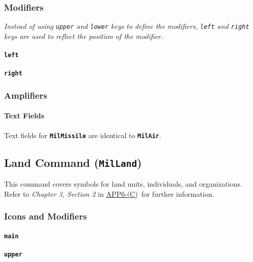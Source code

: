 \documentclass[a4paper, titlepage]{article}
\newcommand\DocLink{\href{https://www.awl.edu.pl/images/en/APP_6_C.pdf}{APP6-(C)}}
\begin{document}
\subsubsection{Modifiers}

\textit{Instead of using \texttt{upper} and \texttt{lower} keys to define the modifiers, \texttt{left} and \texttt{right} keys are used to reflect the position of the modifier.}

\paragraph{\texttt{left}}\quad


\paragraph{\texttt{right}}\quad


\subsubsection{Amplifiers}

\paragraph{Text Fields}

Text fields for \textbf{\texttt{MilMissile}} are identical to \textbf{\texttt{MilAir}}.

\subsection{Land Command (\textbf{\texttt{MilLand}})}

This command covers symbols for land units, individuals, and organizations. Refer to \textit{Chapter 3, Section 2} in \DocLink\ for further information.

\subsubsection{Icons and Modifiers}

\paragraph{\texttt{main}}\quad


\paragraph{\texttt{upper}}\quad

\end{document}
